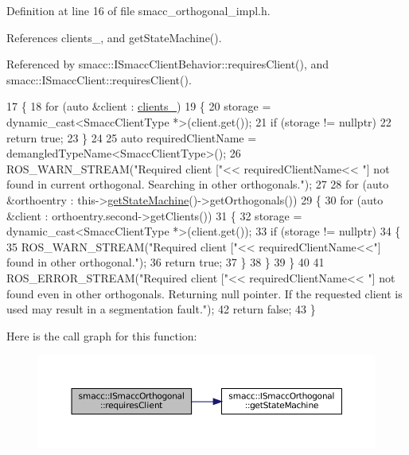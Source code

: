 Definition at line 16 of file smacc\+\_\+orthogonal\+\_\+impl.\+h.



References clients\+\_\+, and get\+State\+Machine().



Referenced by smacc\+::\+I\+Smacc\+Client\+Behavior\+::requires\+Client(), and smacc\+::\+I\+Smacc\+Client\+::requires\+Client().


\begin{DoxyCode}
17 \{
18     \textcolor{keywordflow}{for} (\textcolor{keyword}{auto} &client : \hyperlink{classsmacc_1_1ISmaccOrthogonal_a0f270e9c8c126198f6bce542ab4e04ba}{clients\_})
19     \{
20         storage = \textcolor{keyword}{dynamic\_cast<}SmaccClientType *\textcolor{keyword}{>}(client.get());
21         \textcolor{keywordflow}{if} (storage != \textcolor{keyword}{nullptr})
22             \textcolor{keywordflow}{return} \textcolor{keyword}{true};
23     \}
24 
25     \textcolor{keyword}{auto} requiredClientName = demangledTypeName<SmaccClientType>();
26     ROS\_WARN\_STREAM(\textcolor{stringliteral}{"Required client ["}<< requiredClientName<< \textcolor{stringliteral}{"] not found in current orthogonal.
       Searching in other orthogonals."});
27 
28     \textcolor{keywordflow}{for} (\textcolor{keyword}{auto} &orthoentry : this->\hyperlink{classsmacc_1_1ISmaccOrthogonal_aae265ec480b8ed552ddc79afd2d93a62}{getStateMachine}()->getOrthogonals())
29     \{
30         \textcolor{keywordflow}{for} (\textcolor{keyword}{auto} &client : orthoentry.second->getClients())
31         \{
32             storage = \textcolor{keyword}{dynamic\_cast<}SmaccClientType *\textcolor{keyword}{>}(client.get());
33             \textcolor{keywordflow}{if} (storage != \textcolor{keyword}{nullptr})
34             \{
35                 ROS\_WARN\_STREAM(\textcolor{stringliteral}{"Required client  ["}<< requiredClientName<<\textcolor{stringliteral}{"] found in other orthogonal."});
36                 \textcolor{keywordflow}{return} \textcolor{keyword}{true};
37             \}
38         \}
39     \}
40 
41     ROS\_ERROR\_STREAM(\textcolor{stringliteral}{"Required client ["}<< requiredClientName<< \textcolor{stringliteral}{"] not found even in other orthogonals.
       Returning null pointer. If the requested client is used may result in a segmentation fault."});
42     \textcolor{keywordflow}{return} \textcolor{keyword}{false};
43 \}
\end{DoxyCode}
Here is the call graph for this function\+:
\nopagebreak
\begin{figure}[H]
\begin{center}
\leavevmode
\includegraphics[width=350pt]{classsmacc_1_1ISmaccOrthogonal_a602e16b09f8a1b3de889f2f3d90a3211_cgraph}
\end{center}
\end{figure}
